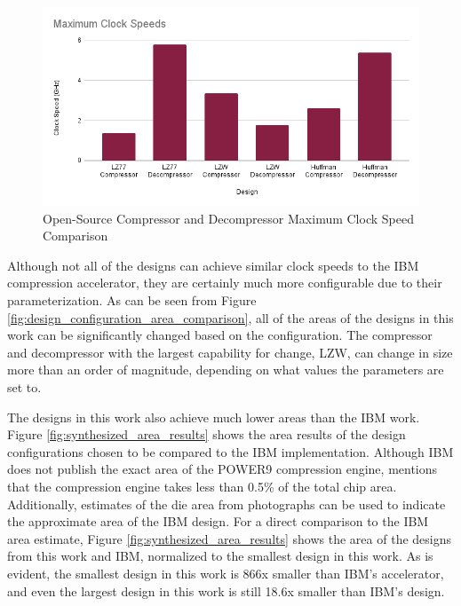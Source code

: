 \documentclass[doublespace,nopageskip]{VTthesis}
\begin{document}
\begin{figure}[htb]
	\centering
	\includegraphics[scale=0.6]{Maximum Clock Speeds.png}
	\caption{Open-Source Compressor and Decompressor Maximum Clock Speed Comparison}
	\label{fig:maximum_clock_speeds}
\end{figure}

Although not all of the designs can achieve similar clock speeds to the IBM compression accelerator, they are certainly much more configurable due to their parameterization. As can be seen from Figure \ref{fig:design_configuration_area_comparison}, all of the areas of the designs in this work can be significantly changed based on the configuration. The compressor and decompressor with the largest capability for change, LZW, can change in size more than an order of magnitude, depending on what values the parameters are set to.

The designs in this work also achieve much lower areas than the IBM work. Figure \ref{fig:synthesized_area_results} shows the area results of the design configurations chosen to be compared to the IBM implementation. Although IBM does not publish the exact area of the POWER9 compression engine, \cite{ibm} mentions that the compression engine takes less than 0.5\% of the total chip area. Additionally, estimates of the die area from photographs can be used to indicate the approximate area of the IBM design\cite{wikichip-ibm-area}. For a direct comparison to the IBM area estimate, Figure \ref{fig:synthesized_area_results} shows the area of the designs from this work and IBM, normalized to the smallest design in this work. As is evident, the smallest design in this work is 866x smaller than IBM's accelerator, and even the largest design in this work is still 18.6x smaller than IBM's design. 
\end{document}

